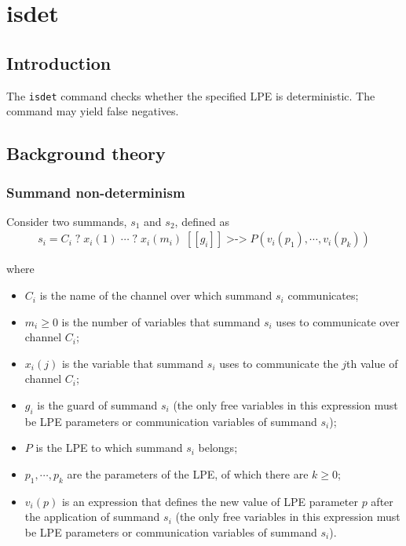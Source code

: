 \chapter{isdet} \label{isdet}

\section{Introduction}

The \texttt{isdet} command checks whether the specified LPE is deterministic.
The command may yield false negatives.

\section{Background theory}

\subsection{Summand non-determinism}

Consider two summands, $s_1$ and $s_2$, defined as
\begin{align*}
s_i = C_i \; \texttt{?} \; x_i(1) \; \cdots{} \; \texttt{?} \; x_i(m_i) \; [[g_i]] \; \texttt{>->} \; P(v_i(p_1), \cdots{}, v_i(p_k))
\end{align*}

where

\begin{itemize}
\item $C_i$ is the name of the channel over which summand $s_i$ communicates;
\item $m_i \geq 0$ is the number of variables that summand $s_i$ uses to communicate over channel $C_i$;
\item $x_i(j)$ is the variable that summand $s_i$ uses to communicate the $j$th value of channel $C_i$;
\item $g_i$ is the guard of summand $s_i$ (the only free variables in this expression must be LPE parameters or communication variables of summand $s_i$);
\item $P$ is the LPE to which summand $s_i$ belongs;
\item $p_1, \cdots{}, p_k$ are the parameters of the LPE, of which there are $k \geq 0$;
\item $v_i(p)$ is an expression that defines the new value of LPE parameter $p$ after the application of summand $s_i$ (the only free variables in this expression must be LPE parameters or communication variables of summand $s_i$).
\end{itemize}

